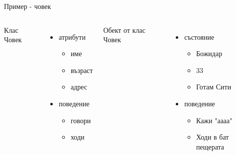 \documentclass{beamer}
\begin{document}
\begin{frame}{Пример - човек}
  \begin{columns}
    Клас Човек
    \begin{itemize}
    \item атрибути
      \begin{itemize}
      \item име
      \item възраст 
      \item адрес
      \end{itemize}
    \item поведение
      \begin{itemize}
      \item говори
      \item ходи
      \end{itemize}
    \end{itemize}

    Обект от клас Човек
    \begin{itemize}
    \item състояние
      \begin{itemize}
      \item Божидар
      \item 33 
      \item Готам Сити
      \end{itemize}
    \item поведение
      \begin{itemize}
      \item Кажи "аааа"
      \item Ходи в бат пещерата
      \end{itemize}
    \end{itemize}
  \end{columns}
\end{frame}
\end{document}
